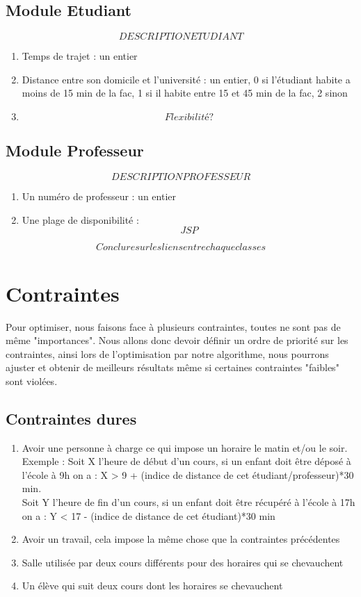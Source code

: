 \documentclass[a4paper,11pt]{article}
\begin{document}
	\subsection{Module Etudiant}
		$$DESCRIPTION ETUDIANT$$
		\begin{enumerate}
			\item Temps de trajet : un entier
			\item Distance entre son domicile et l'université : un entier, 0 si l'étudiant habite a moins de 15 min de la fac, 1 si il habite
			entre 15 et 45 min de la fac, 2 sinon
			\item $$Flexibilité ?$$
			\end{enumerate}
	\subsection{Module Professeur}
		$$DESCRIPTION PROFESSEUR$$
		\begin{enumerate}
			\item Un numéro de professeur : un entier
			\item Une plage de disponibilité : $$JSP$$
			\end{enumerate}
	$$Conclure sur les liens entre chaque classes$$

\section{Contraintes}
	Pour optimiser, nous faisons face à plusieurs contraintes, toutes ne sont pas 
	de même "importances". Nous allons donc devoir définir un ordre de priorité sur 
	les contraintes, ainsi lors de l'optimisation par notre algorithme, nous 
	pourrons ajuster et obtenir de meilleurs résultats même si certaines contraintes
	"faibles" sont violées.\\
	\subsection{Contraintes dures}
		\begin{enumerate}
			\item Avoir une personne à charge ce qui impose un horaire le matin et/ou le soir.\\
			Exemple : Soit X l'heure de début d'un cours, si un enfant doit être déposé à l'école à 9h on a : X > 9 + (indice de distance de cet étudiant/professeur)*30 min.\\
			Soit Y l'heure de fin d'un cours, si un enfant doit être récupéré à l'école à 17h on a : Y < 17 - (indice de distance de cet étudiant)*30 min
			\item Avoir un travail, cela impose la même chose que la contraintes précédentes
			\item Salle utilisée par deux cours différents pour des horaires 
			qui se chevauchent
			\item Un élève qui suit deux cours dont les horaires se chevauchent
		\end{enumerate}
\end{document}
